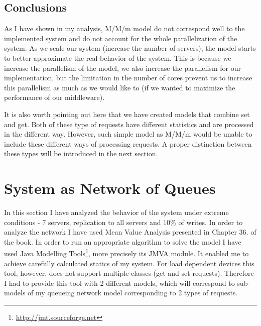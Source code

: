 \documentclass[11pt]{article}
\begin{document}
\subsection{Conclusions}
As I have shown in my analysis, M/M/m model do not correspond well to the implemented system and do not account for the whole parallelization of the system. As we scale our system (increase the number of servers), the model starts to better approximate the real behavior of the system. This is because we increase the parallelism of the model, we also increase the parallelism for our implementation, but the limitation in the number of cores prevent us to increase this parallelism as much as we would like to (if we wanted to maximize the performance of our middleware).

It is also worth pointing out here that we have created models that combine set and get. Both of these type of requests have different statistics and are processed in the different way. However, such simple model as M/M/m would be unable to include these different ways of processing requests. A proper distinction between these types will be introduced in the next section.

\clearpage

\section{System as Network of Queues}\label{sec:network-of-queues}

In this section I have analyzed the behavior of the system under extreme conditions - 7 servers, replication to all servers and 10\% of writes. In order to analyze the network I have used Mean Value Analysis presented in Chapter 36. of the book. In order to run an appropriate algorithm to solve the model I have used Java Modelling Tools\footnote{\url{http://jmt.sourceforge.net}}, more precisely its JMVA module. It enabled me to achieve carefully calculated statics of my system. For load dependent devices this tool, however, does not support multiple classes (get and set requests). Therefore I had to provide this tool with 2 different models, which will correspond to sub-models of my queueing network model corresponding to 2 types of requests.
\end{document}
